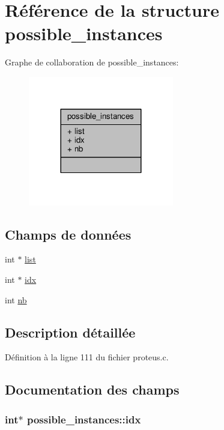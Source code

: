 \hypertarget{structpossible__instances}{\section{Référence de la structure possible\+\_\+instances}
\label{structpossible__instances}
}


Graphe de collaboration de possible\+\_\+instances\+:\nopagebreak
\begin{figure}[H]
\begin{center}
\leavevmode
\includegraphics[width=180pt]{structpossible__instances__coll__graph}
\end{center}
\end{figure}
\subsection*{Champs de données}
\begin{DoxyCompactItemize}
\item 
int $\ast$ \hyperlink{structpossible__instances_ae01205265cde71f6236cd587a9f22a35}{list}
\item 
int $\ast$ \hyperlink{structpossible__instances_a37bc293d1588cc6fc69967936609e0d5}{idx}
\item 
int \hyperlink{structpossible__instances_a881777469e3a7f6b8fe2a60d1c9e77cf}{nb}
\end{DoxyCompactItemize}


\subsection{Description détaillée}


Définition à la ligne 111 du fichier proteus.\+c.



\subsection{Documentation des champs}
\hypertarget{structpossible__instances_a37bc293d1588cc6fc69967936609e0d5}{
\subsubsection[{idx}]{\setlength{\rightskip}{0pt plus 5cm}int$\ast$ possible\+\_\+instances\+::idx}}\label{structpossible__instances_a37bc293d1588cc6fc69967936609e0d5}


